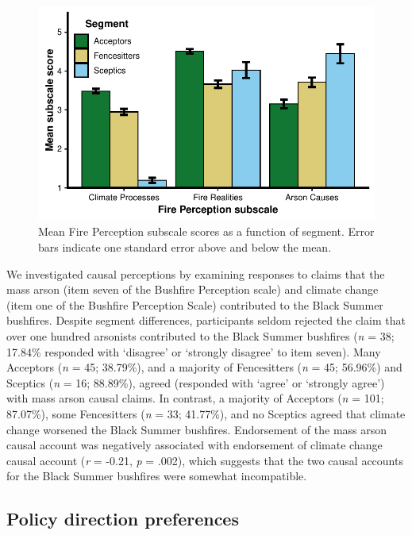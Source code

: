 \documentclass[
  letterpaper,
  DIV=11,
  numbers=noendperiod]{scrartcl}
\begin{document}
\begin{figure}

{\centering \includegraphics{analysis_files/figure-pdf/fig-fps-segment-1.pdf}

}

\caption{\label{fig-fps-segment}Mean Fire Perception subscale scores as
a function of segment. Error bars indicate one standard error above and
below the mean.}

\end{figure}

We investigated causal perceptions by examining responses to claims that
the mass arson (item seven of the Bushfire Perception scale) and climate
change (item one of the Bushfire Perception Scale) contributed to the
Black Summer bushfires. Despite segment differences, participants seldom
rejected the claim that over one hundred arsonists contributed to the
Black Summer bushfires (\emph{n} = 38; 17.84\% responded with `disagree'
or `strongly disagree' to item seven). Many Acceptors (\emph{n} = 45;
38.79\%), and a majority of Fencesitters (\emph{n} = 45; 56.96\%) and
Sceptics (\emph{n} = 16; 88.89\%), agreed (responded with `agree' or
`strongly agree') with mass arson causal claims. In contrast, a majority
of Acceptors (\emph{n} = 101; 87.07\%), some Fencesitters (\emph{n} =
33; 41.77\%), and no Sceptics agreed that climate change worsened the
Black Summer bushfires. Endorsement of the mass arson causal account was
negatively associated with endorsement of climate change causal account
(\emph{r} = -0.21, \emph{p} = .002), which suggests that the two causal
accounts for the Black Summer bushfires were somewhat incompatible.

\hypertarget{policy-direction-preferences-1}{%
\subsection{Policy direction
preferences}\label{policy-direction-preferences-1}}
\end{document}
